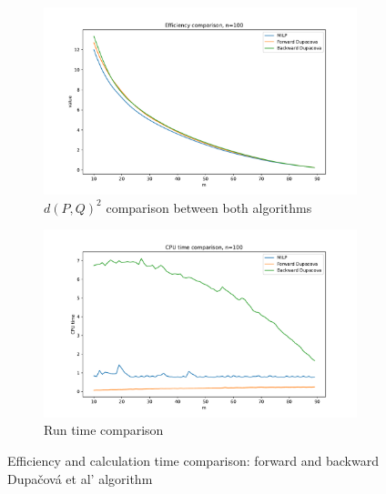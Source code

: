 \documentclass{amsart}
\begin{document}
\begin{figure}[ht]
    \centering
    \begin{subfigure}[b]{0.45\textwidth}
        \centering
        \includegraphics[width=\textwidth]{plots/efficiency milp.pdf}
        \caption{$d\left(P,Q\right)^2$ comparison between both algorithms}
        \label{dist for bac}
    \end{subfigure}
    \hfill
    \begin{subfigure}[b]{0.45\textwidth}
        \centering
        \includegraphics[width=\textwidth]{plots/run time milp.pdf}
        \caption{Run time comparison}
        \label{time for bac}
    \end{subfigure}
    \caption{Efficiency and calculation time comparison: forward and backward Dupačová et al' algorithm}
    \label{comparison dup}
\end{figure}
\end{document}

